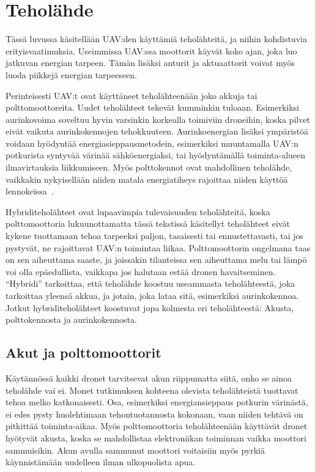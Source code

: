 
\chapter{Teholähde}
\label{ch:teholahde}

Tässä luvussa käsitellään UAV:den käyttämiä teholähteitä, ja niihin kohdistuvia
erityisvaatimuksia. Useimmissa UAV:ssa moottorit käyvät koko ajan, joka luo
jatkuvan energian tarpeen. Tämän lisäksi anturit ja aktuaattorit voivat myös
luoda piikkejä energian tarpeeseen.

Perinteisesti UAV:t ovat käyttäneet teholähteenään joko akkuja tai
polttomoottoreita. Uudet teholähteet tekevät kumminkin tuloaan.  Esimerkiksi
aurinkovoima soveltuu hyvin varsinkin korkealla toimiviin droneihin, koska
pilvet eivät vaikuta aurinkokennojen tehokkuuteen. Aurinkoenergian lisäksi
ympäristöä voidaan hyödyntää energiasieppausmetodein, esimerkiksi muuntamalla
UAV:n potkurista syntyvää värinää sähköenergiaksi, tai hyödyntämällä
toiminta-alueen ilmavirtauksia liikkumiseen. Myös polttokennot ovat
mahdollinen teholähde, vaikkakin nykyisellään niiden matala energiatiheys
rajoittaa niiden käyttöä lennokeissa~\cite{Bradley2007}.

Hybriditeholähteet ovat lupaavimpia tulevaisuuden teholähteitä, koska
polttomoottoria lukuunottamatta tässä tekstissä käsitellyt teholähteet eivät
kykene tuottamaan tehoa tarpeeksi paljon, tasaisesti tai ennustettavasti, tai
jos pystyvät, ne rajoittavat UAV:n toimintaa liikaa. Polttomoottorin ongelmana
taas on sen aiheuttama saaste, ja joissakin tilanteissa sen aiheuttama melu tai
lämpö voi olla epäedullista, vaikkapa jos halutaan estää dronen havaitseminen.
``Hybridi'' tarkoittaa, että teholähde koostuu useammasta teholähteestä, joka
tarkoittaa yleensä akkua, ja jotain, joka lataa sitä, esimerkiksi
aurinkokennoa.  Jotkut hybriditeholähteet koostuvat jopa kolmesta eri
teholähteestä: Akusta, polttokennosta ja aurinkokennosta.~\cite{Chen2010}

\section{Akut ja polttomoottorit}
Käytännössä kaikki dronet tarvitsevat akun riippumatta siitä, onko se ainoa
teholähde vai ei. Monet tutkimuksen kohteena olevista teholähteistä tuottavat
tehoa melko katkonaisesti. Osa, esimerkiksi energiansieppaus potkurin
värinästä, ei edes pysty huolehtimaan tehontuotannosta kokonaan, vaan niiden
tehtävä on pitkittää toiminta-aikaa. Myös polttomoottoria teholähteenään
käyttävät dronet hyötyvät akusta, koska se mahdollistaa elektroniikan
toiminnan vaikka moottori sammuisikin. Akun avulla sammunut moottori voitaisiin
myös pyrkiä käynnistämään uudelleen ilman ulkopuolista apua.

